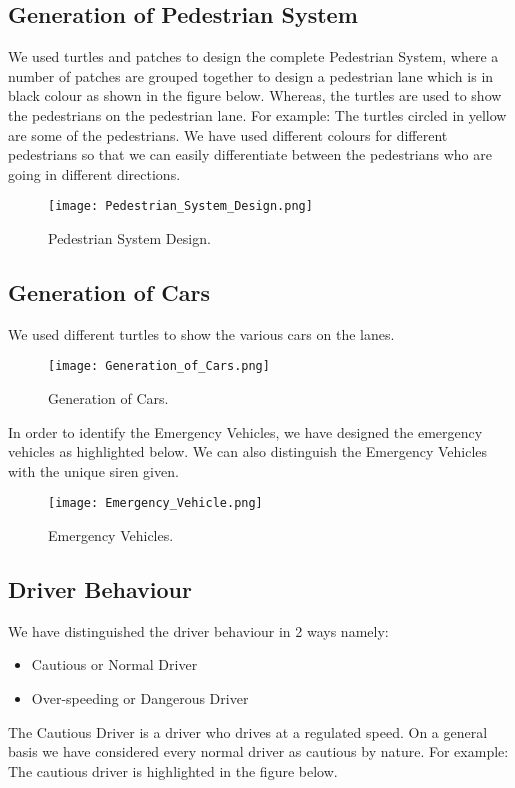 \documentclass[11pt,a4paper]{article}
\begin{document}
\subsection{\textbf{Generation of Pedestrian System}}

We used turtles and patches to design the complete Pedestrian System, where a number of patches are grouped together to design a pedestrian lane which is in black colour as shown in the figure below. Whereas, the turtles are used to show the pedestrians on the pedestrian lane. For example: The turtles circled in yellow are some of the pedestrians.\newline
We have used different colours for different pedestrians so that we can easily differentiate between the pedestrians who are going in different directions.

\begin{figure}[!ht]
\centering
\texttt{[image: Pedestrian\_System\_Design.png]}
\caption{\label{fig:psd}Pedestrian System Design.}
\end{figure}
                                    
\subsection{\textbf{Generation of Cars}}

We used different turtles to show the various cars on the lanes.

\begin{figure}[!ht]
\centering
\texttt{[image: Generation\_of\_Cars.png]}
\caption{\label{fig:goc}Generation of Cars.}
\end{figure}
In order to identify the Emergency Vehicles, we have designed the emergency vehicles as highlighted below. We can also distinguish the Emergency Vehicles with the unique siren given.

\begin{figure}[!ht]
\centering
\texttt{[image: Emergency\_Vehicle.png]}
\caption{\label{fig:ev}Emergency Vehicles.}
\end{figure}
                                   
\subsection{\textbf{Driver Behaviour}}

We have distinguished the driver behaviour in 2 ways namely:
\begin{itemize}
\item Cautious or Normal Driver
\item Over-speeding or Dangerous Driver
\end{itemize}
The Cautious Driver is a driver who drives at a regulated speed. On a general basis we have considered every normal driver as cautious by nature. For example: The cautious driver is highlighted in the figure below.
\end{document}
